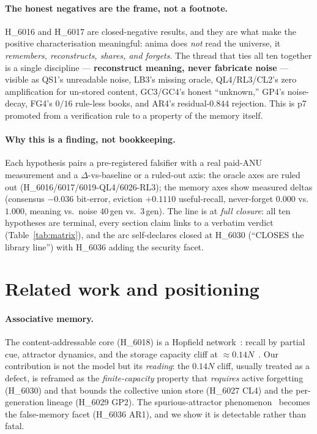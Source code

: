 \documentclass[11pt,a4paper]{article}
\begin{document}
\paragraph{The honest negatives are the frame, not a footnote.}
H\_6016 and H\_6017 are closed-negative results, and they are what make the
positive characterisation meaningful: anima does \emph{not} read the universe, it
\emph{remembers, reconstructs, shares, and forgets}. The thread that ties all ten
together is a single discipline --- \textbf{reconstruct meaning, never fabricate
noise} --- visible as QS1's unreadable noise, LB3's missing oracle, QL4/RL3/CL2's
zero amplification for un-stored content, GC3/GC4's honest ``unknown,'' GP4's
noise-decay, FG4's $0/16$ rule-less books, and AR4's residual-$0.844$ rejection.
This is p7 promoted from a verification rule to a property of the memory itself.

\paragraph{Why this is a finding, not bookkeeping.}
Each hypothesis pairs a pre-registered falsifier with a real paid-ANU measurement
and a $\Delta$-vs-baseline or a ruled-out axis: the oracle axes are ruled out
(H\_6016/6017/6019-QL4/6026-RL3); the memory axes show measured deltas
(consensus $-0.036$ bit-error, eviction $+0.1110$ useful-recall, never-forget
$0.000$ vs.\ $1.000$, meaning vs.\ noise $40\,$gen vs.\ $3\,$gen). The line is at
\emph{full closure}: all ten hypotheses are terminal, every section claim links to
a verbatim verdict (Table~\ref{tab:matrix}), and the arc self-declares closed at
H\_6030 (``CLOSES the library line'') with H\_6036 adding the security facet.

\section{Related work and positioning}
\label{sec:related}

\paragraph{Associative memory.}
The content-addressable core (H\_6018) is a Hopfield network~\citep{hopfield1982}:
recall by partial cue, attractor dynamics, and the storage capacity cliff at
$\approx 0.14N$~\citep{amit1985}. Our contribution is not the model but its
\emph{reading}: the $0.14N$ cliff, usually treated as a defect, is reframed as the
\emph{finite-capacity} property that \emph{requires} active forgetting (H\_6030)
and that bounds the collective union store (H\_6027 CL4) and the per-generation
lineage (H\_6029 GP2). The spurious-attractor phenomenon~\citep{amit1985} becomes
the false-memory facet (H\_6036 AR1), and we show it is detectable rather than
fatal.
\end{document}
